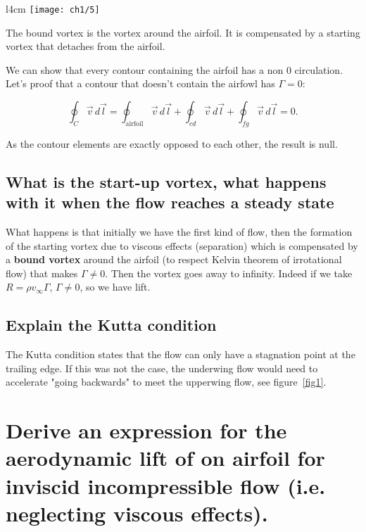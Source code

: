 \documentclass[british,french,11pt, a4paper, openany]{article}
\begin{document}
\begin{wrapfigure}[16]{l}{4cm}
	\vspace{-5mm}
	\texttt{[image: ch1/5]}
\end{wrapfigure}
The bound vortex is the vortex around the airfoil. It is compensated by a starting vortex that detaches from the airfoil.

We can show that every contour containing the airfoil has a non 0 circulation. Let's proof that a contour that doesn't contain the airfowl has $\Gamma =0$: 

\begin{equation}
\oint _{C} \vec{v}\, d\vec{l} = \oint _{\mbox{airfoil}} \vec{v}\, d\vec{l} + \oint _{cd} \vec{v}\, d\vec{l} + \oint _{fg} \vec{v}\, d\vec{l} = 0. 
\end{equation}

As the contour elements are exactly opposed to each other, the result is null. 

\subsection{What is the start-up vortex, what happens with it when the flow reaches a steady state}
What happens is that initially we have the first kind of flow, then the formation of the starting vortex due to viscous effects (separation) which is compensated by a \textbf{bound vortex} around the airfoil (to respect Kelvin theorem of irrotational flow) that makes $\Gamma \neq 0$. Then the vortex goes away to infinity. Indeed if we take $R = \rho v_\infty \Gamma$, $\Gamma \neq 0$, so we have lift. 
\subsection{Explain the Kutta condition}
The Kutta condition states that the flow can only have a stagnation point at the trailing edge. If this was not the case, the underwing flow would need to accelerate "going backwards" to meet the upperwing flow, see figure~\ref{fig1}.


\section{Derive an expression for the aerodynamic lift of on airfoil for inviscid incompressible flow (i.e. neglecting viscous effects).}
\end{document}
